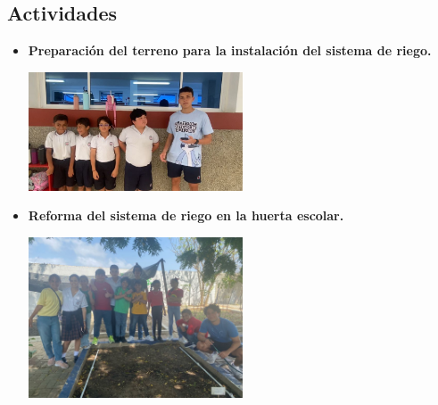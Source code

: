 \documentclass[12pt]{article}
\begin{document}
\subsection*{Actividades}
\begin{itemize}
      \item \textbf{Preparación del terreno para la instalación del sistema de riego.}
            \begin{center}
                  \includegraphics[width=0.5\textwidth]{imagenes/actividad1.jpg}
            \end{center}

      \item \textbf{Reforma del sistema de riego en la huerta escolar.}
            \begin{center}
                  \includegraphics[width=0.5\textwidth]{imagenes/actividad2.jpg}
            \end{center}


\end{itemize}
\end{document}
